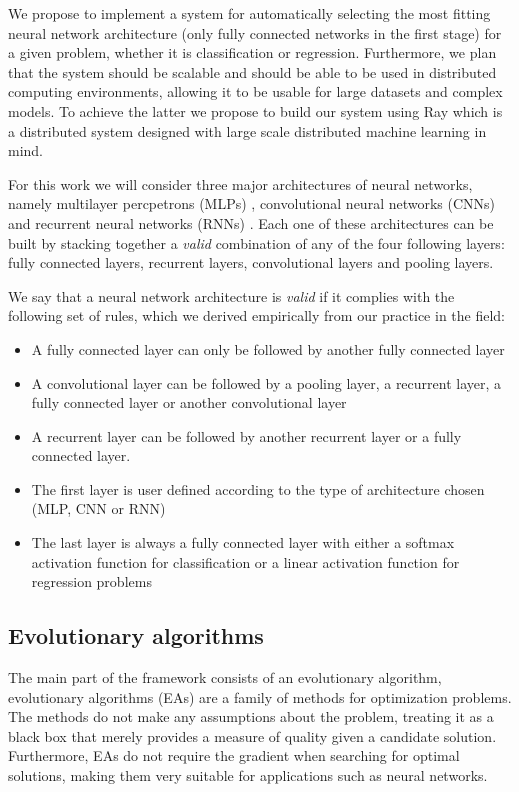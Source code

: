 \documentclass{article}
\begin{document}
We propose to implement a system for automatically selecting the most fitting neural network architecture (only fully connected networks in the first stage) for a given problem, whether it is classification or regression. Furthermore, we plan that the system should be scalable and should be able to be used in distributed computing environments, allowing it to be usable for large datasets and complex models. To achieve the latter we propose to build our system using Ray \cite{Moritz2017} which is a distributed system designed with large scale distributed machine learning in mind.

For this work we will consider three major architectures of neural networks, namely multilayer percpetrons (MLPs) \cite{Engelbrecht2007}, convolutional neural networks (CNNs) \cite{imagenet_cvpr09} and recurrent neural networks (RNNs) \cite{dblp_lipton_2015}. Each one of these architectures can be built by stacking together a \textit{valid} combination of any of the four following layers: fully connected layers, recurrent layers, convolutional layers and pooling layers.

We say that a neural network architecture is \textit{valid} if it complies with the following set of rules, which we derived empirically from our practice in the field:

\begin{itemize}
\item A fully connected layer can only be followed by another fully connected layer
\item A convolutional layer can be followed by a pooling layer, a recurrent layer, a fully connected layer or another convolutional layer
\item A recurrent layer can be followed by another recurrent layer or a fully connected layer.
\item The first layer is user defined according to the type of architecture chosen (MLP, CNN or RNN)
\item The last layer is always a fully connected layer with either a softmax activation function for classification or a linear activation function for regression problems
\end{itemize}

\subsection{Evolutionary algorithms}

The main part of the framework consists of an evolutionary algorithm, evolutionary algorithms (EAs) are a family of methods for optimization problems. The methods do not make any assumptions about the problem, treating it as a black box that merely provides a measure of quality given a candidate solution. Furthermore, EAs do not require the gradient when searching for optimal solutions, making them very suitable for applications such as neural networks.
\end{document}
